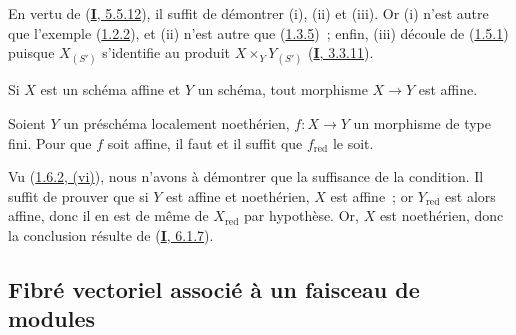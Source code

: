 En vertu de (\hyperref[I.5.5.12-fr]{\textbf{I}, 5.5.12}), il suffit de démontrer (i),
(ii) et (iii). Or (i) n'est autre que l'exemple
(\hyperref[II.1.2.2-fr]{1.2.2}), et (ii) n'est autre que
(\hyperref[II.1.3.5-fr]{1.3.5})~; enfin, (iii) découle de
(\hyperref[II.1.5.1-fr]{1.5.1}) puisque $X_{(S')}$ s'identifie au produit
$X\times_Y Y_{(S')}$ (\hyperref[I.3.3.11-fr]{\textbf{I}, 3.3.11}).

\begin{corollary}[1.6.3]
\label{II.1.6.3-fr}
Si $X$ est un schéma affine et $Y$ un schéma, tout morphisme $X\to Y$ est
affine.
\end{corollary}

\begin{proposition}[1.6.4]
\label{II.1.6.4-fr}
Soient $Y$ un préschéma localement noethérien, $f:X\to Y$ un morphisme de type
fini. Pour que $f$ soit affine, il faut et il suffit que $f_{\mathrm{red}}$ le
soit.
\end{proposition}

Vu (\hyperref[II.1.6.2-fr]{1.6.2, (vi)}), nous n'avons à démontrer que la
suffisance de la condition. Il suffit de prouver que si $Y$ est affine et
noethérien, $X$ est affine~; or $Y_{\mathrm{red}}$ est alors affine, donc il
en est de même de $X_{\mathrm{red}}$ par hypothèse. Or, $X$ est noethérien,
donc la conclusion résulte de (\hyperref[I.6.1.7-fr]{\textbf{I}, 6.1.7}).

\subsection{Fibré vectoriel associé à un faisceau de modules}
\label{II.1.7-fr}


